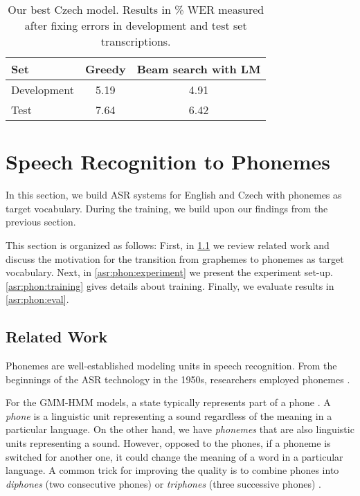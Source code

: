 \begin{table}[t]
	\centering
	\begin{tabular}{lcc}
		\bf Set & \bf Greedy & \bf Beam search with LM \\
		\hline
		Development & 5.19 & 4.91 \\
		Test & 7.64 & 6.42 \\
	\end{tabular}
	\caption[The best Czech model performance]{Our best Czech model. Results in \% WER measured after fixing errors in development and test set transcriptions.}
	\label{tab:results_rerun}
\end{table}

\pagebreak


\section{Speech Recognition to Phonemes}
\label{asr:transfer_phonemes}
In this section, we build ASR systems for English and Czech with phonemes as target vocabulary. During the training, we build upon our findings from the previous section.

This section is organized as follows: First, in \cref{asr:phon:related} we review related work and discuss the motivation for the transition from graphemes to phonemes as target vocabulary. Next, in \cref{asr:phon:experiment} we present the experiment set-up. \cref{asr:phon:training} gives details about training. Finally, we evaluate results in \cref{asr:phon:eval}.

\subsection{Related Work}
\label{asr:phon:related}

Phonemes are well-established modeling units in speech recognition. From the beginnings of the ASR technology in the 1950s, researchers employed phonemes . 

For the GMM-HMM models, a state typically represents part of a phone . A \emph{phone} is a linguistic unit representing a sound regardless of the meaning in a particular language. On the other hand, we have \emph{phonemes} that are also linguistic units representing a sound. However, opposed to the phones, if a phoneme is switched for another one, it could change the meaning of a word in a particular language. A common trick for improving the quality is to combine phones into \emph{diphones} (two consecutive phones) or \emph{triphones} (three successive phones) .  

